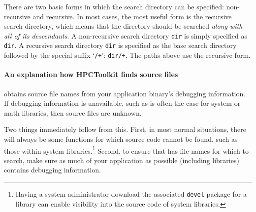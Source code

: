 \documentclass[11pt,twoside,letterpaper]{report}
\begin{document}
There are two basic forms in which the search directory can be specified: non-recursive and recursive.
In most cases, the most useful form is the recursive search directory, which means that the directory should be searched \emph{along with all of its descendants}.
A non-recursive search directory \texttt{dir} is simply specified as \texttt{dir}.
A recursive search directory \texttt{dir} is specified as the base search directory followed by the special suffix `\texttt{/+}': \texttt{dir/+}.
The paths above use the recursive form.


\paragraph{An explanation how HPCToolkit finds source files}

\hpcprofAll{} obtains source file names from your application binary's debugging information.
If debugging information is unavailable, such as is often the case for system or math libraries, then source files are unknown.


Two things immediately follow from this.
First, in most normal situations, there will always be some functions for which source code cannot be found, such as those within system libraries.\footnote{Having a system administrator download the associated {\tt devel} package for a library can enable visibility into the source code of system libraries.}
Second, to ensure that \hpcprofAll{} has file names for which to search, make sure as much of your application as possible (including libraries) contains debugging information.
\end{document}
